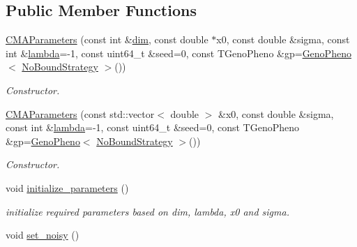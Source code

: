 \subsection*{Public Member Functions}
\begin{DoxyCompactItemize}
\item 
\hyperlink{classlibcmaes_1_1CMAParameters_a18d6039c0adffddd51caee1250b072bc}{C\-M\-A\-Parameters} (const int \&\hyperlink{classlibcmaes_1_1Parameters_a95a3c04400a77d134bb1e9705189a24e}{dim}, const double $\ast$x0, const double \&sigma, const int \&\hyperlink{classlibcmaes_1_1Parameters_a3d569987e9a5eb61bc781ee75b2ab18a}{lambda}=-\/1, const uint64\-\_\-t \&seed=0, const T\-Geno\-Pheno \&gp=\hyperlink{classlibcmaes_1_1GenoPheno}{Geno\-Pheno}$<$ \hyperlink{classlibcmaes_1_1NoBoundStrategy}{No\-Bound\-Strategy} $>$())
\begin{DoxyCompactList}\small\item\em Constructor. \end{DoxyCompactList}\item 
\hyperlink{classlibcmaes_1_1CMAParameters_a676e688fd58f9244886270f32cbad47e}{C\-M\-A\-Parameters} (const std\-::vector$<$ double $>$ \&x0, const double \&sigma, const int \&\hyperlink{classlibcmaes_1_1Parameters_a3d569987e9a5eb61bc781ee75b2ab18a}{lambda}=-\/1, const uint64\-\_\-t \&seed=0, const T\-Geno\-Pheno \&gp=\hyperlink{classlibcmaes_1_1GenoPheno}{Geno\-Pheno}$<$ \hyperlink{classlibcmaes_1_1NoBoundStrategy}{No\-Bound\-Strategy} $>$())
\begin{DoxyCompactList}\small\item\em Constructor. \end{DoxyCompactList}\item 
\hypertarget{classlibcmaes_1_1CMAParameters_a0d963d4719d9b6447cddeeca542167a1}{void \hyperlink{classlibcmaes_1_1CMAParameters_a0d963d4719d9b6447cddeeca542167a1}{initialize\-\_\-parameters} ()}\label{classlibcmaes_1_1CMAParameters_a0d963d4719d9b6447cddeeca542167a1}

\begin{DoxyCompactList}\small\item\em initialize required parameters based on dim, lambda, x0 and sigma. \end{DoxyCompactList}\item 
\hypertarget{classlibcmaes_1_1CMAParameters_aa6dc1bafcff83e082db9146a923949d3}{void \hyperlink{classlibcmaes_1_1CMAParameters_aa6dc1bafcff83e082db9146a923949d3}{set\-\_\-noisy} ()}\label{classlibcmaes_1_1CMAParameters_aa6dc1bafcff83e082db9146a923949d3}


\end{DoxyCompactItemize}
